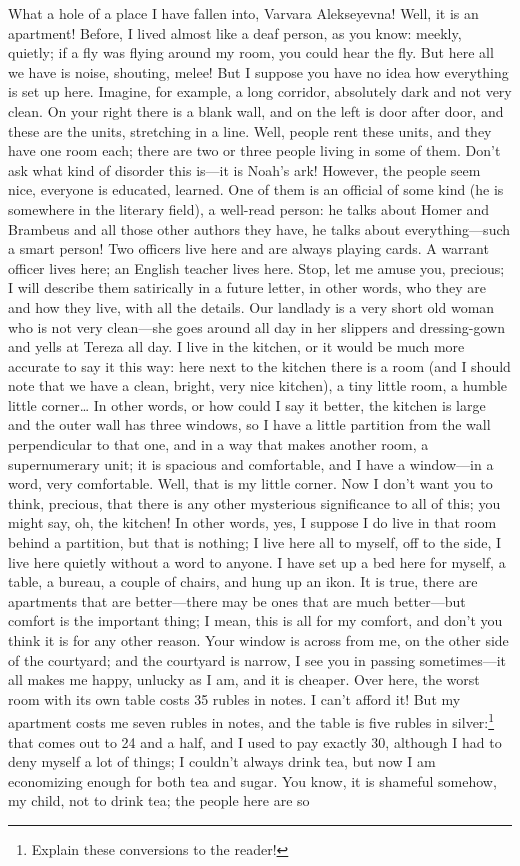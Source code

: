 What a hole of a place I have fallen into, Varvara Alekseyevna! Well, it is an apartment! Before, I lived almost like a deaf person, as you know: meekly, quietly; if a fly was flying around my room, you could hear the fly. But here all we have is noise, shouting, melee! But I suppose you have no idea how everything is set up here. Imagine, for example, a long corridor, absolutely dark and not very clean. On your right there is a blank wall, and on the left is door after door, and these are the units, stretching in a line. Well, people rent these units, and they have one room each; there are two or three people living in some of them. Don't ask what kind of disorder this is---it is Noah's ark! However, the people seem nice, everyone is educated, learned. One of them is an official of some kind (he is somewhere in the literary field), a well-read person: he talks about Homer and Brambeus and all those other authors they have, he talks about everything---such a smart person! Two officers live here and are always playing cards. A warrant officer lives here; an English teacher lives here. Stop, let me amuse you, precious; I will describe them satirically in a future letter, in other words, who they are and how they live, with all the details. Our landlady is a very short old woman who is not very clean---she goes around all day in her slippers and dressing-gown and yells at Tereza all day. I live in the kitchen, or it would be much more accurate to say it this way: here next to the kitchen there is a room (and I should note that we have a clean, bright, very nice kitchen), a tiny little room, a humble little corner\ldots{} In other words, or how could I say it better, the kitchen is large and the outer wall has three windows, so I have a little partition from the wall perpendicular to that one, and in a way that makes another room, a supernumerary unit; it is spacious and comfortable, and I have a window---in a word, very comfortable. Well, that is my little corner. Now I don't want you to think, precious, that there is any other mysterious significance to all of this; you might say, oh, the kitchen! In other words, yes, I suppose I do live in that room behind a partition, but that is nothing; I live here all to myself, off to the side, I live here quietly without a word to anyone. I have set up a bed here for myself, a table, a bureau, a couple of chairs, and hung up an ikon. It is true, there are apartments that are better---there may be ones that are much better---but comfort is the important thing; I mean, this is all for my comfort, and don't you think it is for any other reason. Your window is across from me, on the other side of the courtyard; and the courtyard is narrow, I see you in passing sometimes---it all makes me happy, unlucky as I am, and it is cheaper. Over here, the worst room with its own table costs 35 rubles in notes. I can't afford it! But my apartment costs me seven rubles in notes, and the table is five rubles in silver:\footnote{Explain these conversions to the reader!} that comes out to 24 and a half, and I used to pay exactly 30, although I had to deny myself a lot of things; I couldn't always drink tea, but now I am economizing enough for both tea and sugar. You know, it is shameful somehow, my child, not to drink tea; the people here are so 